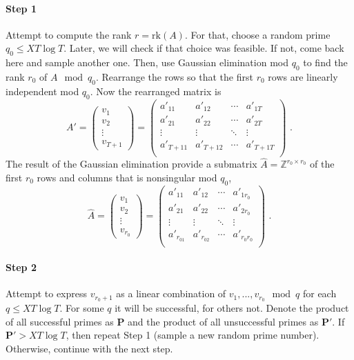 \documentclass[paper=a4, fontsize=11pt]{scrartcl} %
\numberwithin{equation}{section} %
\numberwithin{figure}{section} %
\numberwithin{table}{section} %
\begin{document}
\paragraph{Step 1}Attempt to compute the rank $r = \mathrm{rk}(A)$. For that, choose a random prime $q_0\leq XT\log T$. Later, we will check if that choice was feasible. If not, come back here and sample another one. Then, use Gaussian elimination mod $q_0$ to find the rank $r_0$ of $A\mod q_0$. Rearrange the rows so that the first $r_0$ rows are linearly independent mod $q_0$. Now the rearranged matrix is
\begin{equation}
A' =
\begin{pmatrix}
v_1\\v_2\\\vdots\\v_{T\!+\!1}
\end{pmatrix}
=
\begin{pmatrix}
a'_{11} & a'_{12} & \cdots & a'_{1T} \\
a'_{21} & a'_{22} & \cdots & a'_{2T} \\
\vdots & \vdots & \ddots & \vdots \\
a'_{T\!+\!11} & a'_{T\!+\!12} & \cdots & a'_{T\!+\!1T} \\
\end{pmatrix}
\text{ .}
\end{equation}
The result of the Gaussian elimination provide a submatrix $\hat{A} = \mathbb{Z}^{r_0\times r_0}$ of the first $r_0$ rows and columns that is nonsingular mod $q_0$,
\begin{equation}
\hat{A} =
\begin{pmatrix}
v_1\\v_2\\\vdots\\v_{r_0}
\end{pmatrix}
=
\begin{pmatrix}
a'_{11} & a'_{12} & \cdots & a'_{1r_0} \\
a'_{21} & a'_{22} & \cdots & a'_{2r_0} \\
\vdots & \vdots & \ddots & \vdots \\
a'_{r_01} & a'_{r_02} & \cdots & a'_{r_0r_0} \\
\end{pmatrix}
\text{ .}
\end{equation}
\paragraph{Step 2} Attempt to express $v_{r_0+1}$ as a linear combination of $v_1,...,v_{r_0}\mod q$ for each $q\leq XT\log T$. For some $q$ it will be successful, for others not. Denote the product of all successful primes as $\boldsymbol{P}$ and the product of all unsuccessful primes as $\boldsymbol{P'}$. If $\boldsymbol{P'} > XT\log T$, then repeat Step 1 (sample a new random prime number). Otherwise, continue with the next step.
\end{document}
